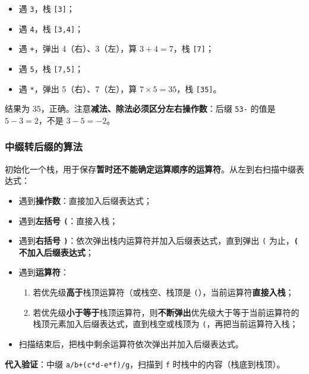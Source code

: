 \documentclass[11pt,openany,UTF8]{ctexbook}
\begin{document}
\begin{itemize}
\item 遇 \texttt{3}，栈 \texttt{[3]\allowbreak{}}；
\item 遇 \texttt{4}，栈 \texttt{[3,\allowbreak{}4]\allowbreak{}}；
\item 遇 \texttt{+\allowbreak{}}，弹出 4（右）、3（左），算 $3+4=7$，栈 \texttt{[7]\allowbreak{}}；
\item 遇 \texttt{5}，栈 \texttt{[7,\allowbreak{}5]\allowbreak{}}；
\item 遇 \texttt{*}，弹出 5（右）、7（左），算 $7 \times 5 = 35$，栈 \texttt{[35]\allowbreak{}}。
\end{itemize}
结果为 35，正确。注意\textbf{减法、除法必须区分左右操作数}：后缀 \texttt{53-} 的值是 $5-3=2$，不是 $3-5=-2$。

\subsubsection{中缀转后缀的算法}

初始化一个栈，用于保存\textbf{暂时还不能确定运算顺序的运算符}。从左到右扫描中缀表达式：

\begin{itemize}
\item 遇到\textbf{操作数}：直接加入后缀表达式；
\item 遇到\textbf{左括号 \texttt{(}}：直接入栈；
\item 遇到\textbf{右括号 \texttt{)\allowbreak{}}}：依次弹出栈内运算符并加入后缀表达式，直到弹出 \texttt{(} 为止，\textbf{\texttt{(} 不加入后缀表达式}；
\item 遇到\textbf{运算符}：
\begin{enumerate}
\item 若优先级\textbf{高于}栈顶运算符（或栈空、栈顶是 \texttt{(}），当前运算符\textbf{直接入栈}；
\item 若优先级\textbf{小于等于}栈顶运算符，则\textbf{不断弹出}优先级大于等于当前运算符的栈顶元素加入后缀表达式，直到栈空或栈顶为 \texttt{(}，再把当前运算符入栈；
\end{enumerate}
\item 扫描结束后，把栈中剩余运算符依次弹出并加入后缀表达式。
\end{itemize}
\textbf{代入验证}：中缀 \texttt{a/\allowbreak{}b+\allowbreak{}(c*d-e*f)\allowbreak{}/\allowbreak{}g}，扫描到 \texttt{f} 时栈中的内容（栈底到栈顶）。
\end{document}
